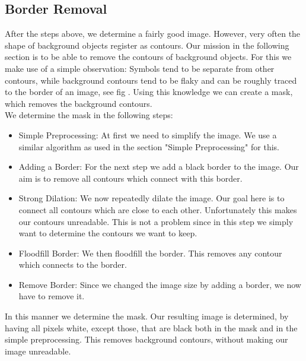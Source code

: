 \documentclass[12pt]{article}
\begin{document}
	
	\subsection{Border Removal}%
		After the steps above, we determine a fairly good image.
		However, very often the shape of background objects register as contours.
		Our mission in the following section is to be able to remove the contours of background objects.
		For this we make use of a simple observation: Symbols tend to be separate from other contours, while background contours tend to be flaky and can be roughly traced to the border of an image, see fig .%
		Using this knowledge we can create a mask, which removes the background contours.\\
		We determine the mask in the following steps:
		\begin{itemize}
			\item Simple Preprocessing: At first we need to simplify the image. We use a similar algorithm as used in the section "Simple Preprocessing" for this.
			\item Adding a Border: For the next step we add a black border to the image. Our aim is to remove all contours which connect with this border.
			\item Strong Dilation: We now repeatedly dilate the image. Our goal here is to connect all contours which are close to each other.
			Unfortunately this makes our contours unreadable.
			This is not a problem since in this step we simply want to determine the contours we want to keep.
			\item Floodfill Border: We then floodfill the border.
			This removes any contour which connects to the border. 
			\item Remove Border: Since we changed the image size by adding a border, we now have to remove it.
		\end{itemize}
		In this manner we determine the mask.
		Our resulting image is determined, by having all pixels white, except those, that are black both in the mask and in the simple preprocessing.
		This removes background contours, without making our image unreadable.
\end{document}
